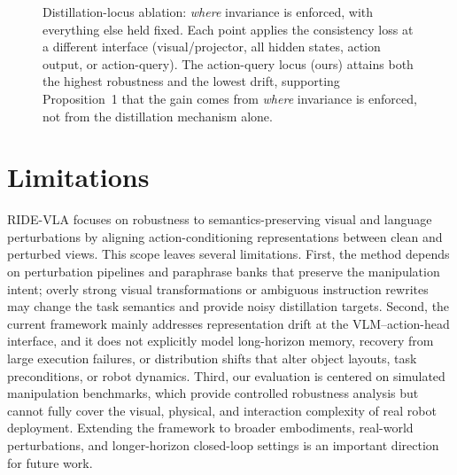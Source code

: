\documentclass[letterpaper]{article} %
\newcommand{\method}{\textsc{RIDE-VLA}}
\begin{document}
\begin{figure}[t]
\centering
\caption{Distillation-locus ablation: \emph{where} invariance is enforced, with everything else held fixed. Each point applies the consistency loss at a different interface (visual/projector, all hidden states, action output, or action-query). The action-query locus (ours) attains both the highest robustness and the lowest drift, supporting Proposition~1 that the gain comes from \emph{where} invariance is enforced, not from the distillation mechanism alone.}
\label{fig:locus}
\end{figure}

\section{Limitations}

\method{} focuses on robustness to semantics-preserving visual and language perturbations by aligning action-conditioning representations between clean and perturbed views. This scope leaves several limitations. First, the method depends on perturbation pipelines and paraphrase banks that preserve the manipulation intent; overly strong visual transformations or ambiguous instruction rewrites may change the task semantics and provide noisy distillation targets. Second, the current framework mainly addresses representation drift at the VLM--action-head interface, and it does not explicitly model long-horizon memory, recovery from large execution failures, or distribution shifts that alter object layouts, task preconditions, or robot dynamics. Third, our evaluation is centered on simulated manipulation benchmarks, which provide controlled robustness analysis but cannot fully cover the visual, physical, and interaction complexity of real robot deployment. Extending the framework to broader embodiments, real-world perturbations, and longer-horizon closed-loop settings is an important direction for future work.
\end{document}
